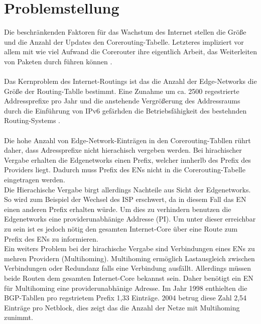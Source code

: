 \section{Problemstellung}
Die beschränkenden Faktoren für das Wachstum des Internet stellen die Größe und die Anzahl der Updates den Corerouting-Tabelle. Letzteres impliziert vor allem mit wie viel Aufwand die Corerouter ihre eigentlich Arbeit, das Weiterleiten von Paketen durch führen können \cite{Huston:2003:BGP}.

\paragraph{}
Das Kernproblem des Internet-Routings ist das die Anzahl der Edge-Networks die Größe der Routing-Tablle bestimmt. Eine Zunahme um ca. 2500 regestrierte Addressprefixe pro Jahr \cite{journals/ccr/MengXZHLZ04} und die anstehende Vergrößerung des Addressraums durch die Einführung von IPv6 gefärhden die Betriebsfähigkeit des bestehnden Routing-Systems \cite{jen:2008:start}.

\paragraph{}
Die hohe Anzahl von Edge-Network-Einträgen in den Corerouting-Tabllen rührt daher, dass Adressprefixe nicht hierachisch vergeben werden. Bei hirachischer Vergabe erhalten die Edgenetworks einen Prefix, welcher innherlb des Prefix des Providers liegt. Dadurch muss Prefix des ENs nicht in die Corerouting-Tabelle eingetragen werden. \\
Die Hierachische Vergabe birgt allerdings Nachteile aus Sicht der Edgenetworks. So wird zum Beispiel der Wechsel des ISP erschwert, da in diesem Fall das EN einen anderen Prefix erhalten würde. Um dies zu verhindern benutzen die Edgenetworks eine providerunabhänige Addresse (PI). Um unter dieser erreichbar zu sein ist es jedoch nötig den gesamten Internet-Core über eine Route zum Prefix des ENs zu informieren. \\
Ein weiters Problem bei der hirachische Vergabe sind Verbindungen eines ENs zu mehren Providern (Multihoming). Multihoming ermöglich Lastausgleich zwischen Verbindungen oder Redundanz falls eine Verbindung ausfällt. Allerdings müssen beide Routen dem gesamten Internet-Core bekannst sein. Daher benötigt ein EN für Multihoming eine providerunabhänige Adresse. Im Jahr 1998 enthielten die BGP-Tabllen pro regstrietem Prefix 1,33 Einträge. 2004 betrug diese Zahl 2,54 Einträge pro Netblock, dies zeigt das die Anzahl der Netze mit Multihoming zunimmt.

